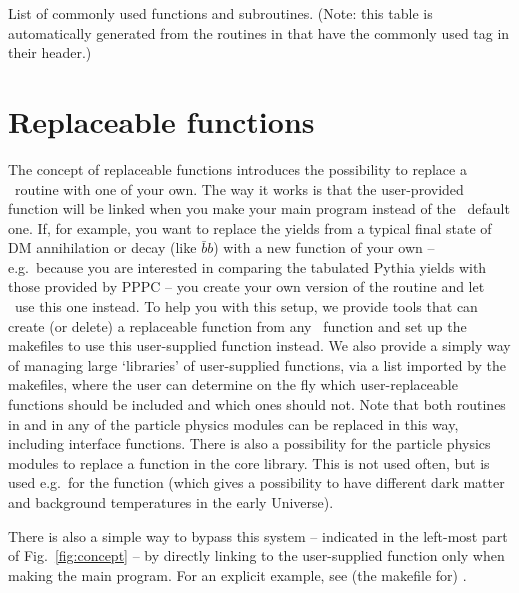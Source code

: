 \bigskip

\begin{table}[!h]
[CULIST]
\caption{List of commonly used functions and subroutines. (Note: this table is automatically generated from the routines in  that have the commonly used tag in their header.)}
\label{tab:culist}
\end{table}


\section{Replaceable functions}
\label{sec:replaceable}
The concept of replaceable functions introduces the possibility to replace a \ds\ routine with one of your own. The way it works is that the user-provided function will be linked 
when you make your main program instead of the \ds\ default one. If, for example, you want to 
replace the yields from a typical final state of DM annihilation or decay (like $\bar bb$)
with a new function of your own -- e.g.~because you are interested in comparing the tabulated
{\sf Pythia} \cite{Sjostrand:2006za} yields with those provided by PPPC \cite{Cirelli:2010xx} --  
you create your own version of the routine  and let \ds\ use this one 
instead.  To help you with this setup, 
we provide tools that can create (or delete) a replaceable function from any \ds\ function 
and set up the makefiles to use this user-supplied function instead. We also provide a
simply way of managing large `libraries' of user-supplied functions, via a list imported 
by the makefiles, where the user can determine on the fly which user-replaceable 
functions should be included and which ones should not.  Note that both routines in 
 and in any of the particle physics modules can be replaced in this way,
including interface functions. There is also a possibility for the particle physics modules to replace a
function in the core library. This is not used often, but is used e.g.\ for the function  (which gives a possibility to have different dark matter and background temperatures in the early Universe).

There is also a simple way to bypass this system  -- indicated in the left-most part of Fig.~\ref{fig:concept} --
by directly linking to the user-supplied function only when making the main program. 
 For an explicit example, see (the makefile for) .

